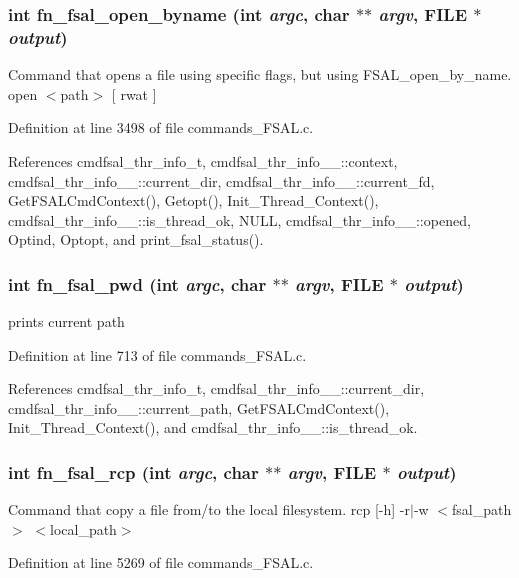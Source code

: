 \subsubsection{\setlength{\rightskip}{0pt plus 5cm}int fn\_\-fsal\_\-open\_\-byname (int {\em argc}, char $\ast$$\ast$ {\em argv}, FILE $\ast$ {\em output})}\label{commands_8h_a23}


Command that opens a file using specific flags, but using FSAL\_\-open\_\-by\_\-name. open $<$path$>$ [ rwat ] 

Definition at line 3498 of file commands\_\-FSAL.c.

References cmdfsal\_\-thr\_\-info\_\-t, cmdfsal\_\-thr\_\-info\_\-\_\-::context, cmdfsal\_\-thr\_\-info\_\-\_\-::current\_\-dir, cmdfsal\_\-thr\_\-info\_\-\_\-::current\_\-fd, Get\-FSALCmd\-Context(), Getopt(), Init\_\-Thread\_\-Context(), cmdfsal\_\-thr\_\-info\_\-\_\-::is\_\-thread\_\-ok, NULL, cmdfsal\_\-thr\_\-info\_\-\_\-::opened, Optind, Optopt, and print\_\-fsal\_\-status().
\subsubsection{\setlength{\rightskip}{0pt plus 5cm}int fn\_\-fsal\_\-pwd (int {\em argc}, char $\ast$$\ast$ {\em argv}, FILE $\ast$ {\em output})}\label{commands_8h_a7}


prints current path 

Definition at line 713 of file commands\_\-FSAL.c.

References cmdfsal\_\-thr\_\-info\_\-t, cmdfsal\_\-thr\_\-info\_\-\_\-::current\_\-dir, cmdfsal\_\-thr\_\-info\_\-\_\-::current\_\-path, Get\-FSALCmd\-Context(), Init\_\-Thread\_\-Context(), and cmdfsal\_\-thr\_\-info\_\-\_\-::is\_\-thread\_\-ok.
\subsubsection{\setlength{\rightskip}{0pt plus 5cm}int fn\_\-fsal\_\-rcp (int {\em argc}, char $\ast$$\ast$ {\em argv}, FILE $\ast$ {\em output})}\label{commands_8h_a30}


Command that copy a file from/to the local filesystem. rcp [-h] -r$|$-w $<$fsal\_\-path$>$ $<$local\_\-path$>$ 

Definition at line 5269 of file commands\_\-FSAL.c.

